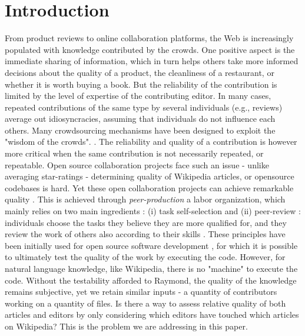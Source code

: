 \section{Introduction}
From product reviews to online collaboration platforms, the Web is increasingly populated with knowledge contributed by the crowds. One positive aspect is the immediate sharing of information, which in turn helps others take more informed decisions about the quality of a product, the cleanliness of a restaurant, or whether it is worth buying a book. But the reliability of the contribution is limited by the level of expertise of the contributing editor. In many cases, repeated contributions of the same type by several individuals (e.g., reviews) average out idiosyncracies, assuming that individuals do not influence each others. 
Many crowdsourcing mechanisms have been designed to exploit the "wisdom of the crowds". \cite{https://en.wikipedia.org/wiki/The_Wisdom_of_Crowds}. The reliability and quality of a contribution is however more critical  when the same contribution is not necessarily repeated, or repeatable. Open source collaboration projects face such an issue - unlike averaging star-ratings - determining quality of Wikipedia articles, or opensource codebases is hard. Yet these open collaboration projects can achieve remarkable quality \cite{nature paper}. This is achieved through {\it peer-production} a labor organization, which mainly relies on two main ingredients : (i) task self-selection and (ii) peer-review : individuals choose the tasks they believe they are more qualified for, and they review the work of others also according to their skills \cite{benkler2002}. These principles have been initially used for open source software development \cite{raymond1999}, for which it is possible to ultimately test the quality of the work by executing the code. However, for natural language knowledge, like  Wikipedia, there is no "machine" to execute the code. Without the testability afforded to Raymond, the quality of the knowledge remains subjective, yet we retain similar inputs - a quantity of contributors working on a quantity of files.
Is there a way to assess relative quality of both articles and editors by only considering which editors have touched which articles on Wikipedia? This is the problem we are addressing in this paper.